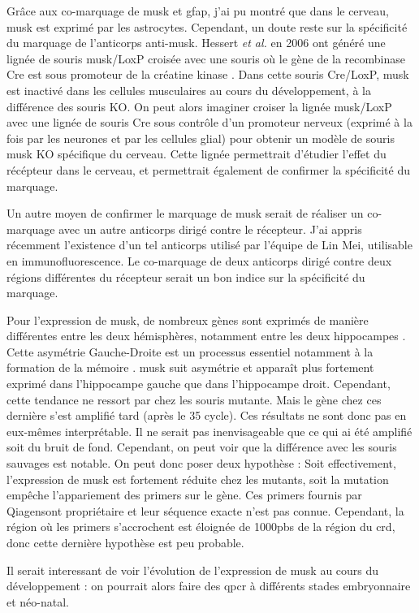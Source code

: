 Grâce aux co-marquage de \gls{musk} et \gls{gfap}, j'ai pu montré que dans le cerveau, \gls{musk} est exprimé par les astrocytes. Cependant,  un doute reste sur la spécificité du marquage de l'anticorps anti-\gls{musk}. Hessert \emph{et al.} en 2006 ont généré une lignée de souris \gls{musk}/LoxP croisée avec une souris où le gène de la recombinase Cre est sous promoteur de la créatine kinase \cite{Hesser2006}. Dans cette souris Cre/LoxP, \gls{musk} est inactivé dans les cellules musculaires au cours du développement, à la différence des souris KO. On peut alors imaginer croiser la lignée \gls{musk}/LoxP avec une lignée de souris Cre sous contrôle d'un promoteur nerveux (exprimé à la fois par les neurones et par les cellules glial) pour obtenir un modèle de souris \gls{musk} KO spécifique du cerveau. Cette lignée permettrait d'étudier l'effet du récépteur dans le cerveau, et permettrait également de confirmer la spécificité du marquage.

Un autre moyen de confirmer le marquage de \gls{musk} serait de réaliser un co-marquage avec un autre anticorps dirigé contre le récepteur. J'ai appris récemment l'existence d'un tel anticorps utilisé par l'équipe de Lin Mei, utilisable en immunofluorescence. Le co-marquage de deux anticorps dirigé contre deux régions différentes du récepteur serait un bon indice sur la spécificité du marquage. 

Pour l'expression de \gls{musk}, de nombreux gènes sont exprimés de manière différentes entre les deux hémisphères, notamment entre les deux hippocampes \cite{Moskal2006}. Cette asymétrie Gauche-Droite est un processus essentiel notamment à la formation de la mémoire \cite{Shimbo2018}. \gls{musk} suit asymétrie et apparaît plus fortement exprimé dans l'hippocampe gauche que dans l'hippocampe droit. Cependant, cette tendance ne ressort par chez les souris mutante. Mais le gène chez ces dernière s'est amplifié tard (après le 35 cycle). Ces résultats ne sont donc pas en eux-mêmes interprétable. Il ne serait pas inenvisageable que ce qui ai été amplifié soit du bruit de fond. Cependant, on peut voir que la différence avec les souris sauvages est notable. On peut donc poser deux hypothèse : Soit effectivement, l'expression de \gls{musk} est fortement réduite chez les mutants, soit la mutation empêche l'appariement des primers sur le gène. Ces primers fournis par Qiagen\texttrademark sont propriétaire et leur séquence exacte n'est pas connue. Cependant, la région où les primers s'accrochent est éloignée de 1000pbs de la région du \gls{crd}, donc cette dernière hypothèse est peu probable.

Il serait interessant de voir l'évolution de l'expression de \gls{musk} au cours du développement : on pourrait alors faire des \gls{qpcr} à différents stades embryonnaire et néo-natal.